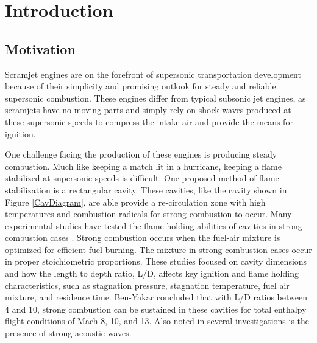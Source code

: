 
\chapter{Introduction} %

\label{Chapter2} %



\section{Motivation}

Scramjet engines are on the forefront of supersonic transportation development because of their simplicity and promising outlook for steady and reliable supersonic combustion. These engines differ from typical subsonic jet engines, as scramjets have no moving parts and simply rely on shock waves produced at these supersonic speeds to compress the intake air and provide the means for ignition.

One challenge facing the production of these engines is producing steady combustion. Much like keeping a match lit in a hurricane, keeping a flame stabilized at supersonic speeds is difficult. One proposed method of flame stabilization is a rectangular cavity. These cavities, like the cavity shown in Figure \ref{CavDiagram}, are able provide a re-circulation zone with high temperatures and combustion radicals for strong combustion to occur. Many experimental studies have tested the flame-holding abilities of cavities in strong combustion cases \cite{ben2000experimental,ben2001cavity,do2009plasma,yilmaz2013investigation}. Strong combustion occurs when the fuel-air mixture is optimized for efficient fuel burning. The mixture in strong combustion cases occur in proper stoichiometric proportions. These studies focused on cavity dimensions and how the length to depth ratio, L/D, affects key ignition and flame holding characteristics, such as stagnation pressure, stagnation temperature, fuel air mixture, and residence time. Ben-Yakar concluded that with L/D ratios between 4 and 10, strong combustion can be sustained in these cavities for total enthalpy flight conditions of Mach 8, 10, and 13\cite{ben2001cavity}. Also noted in several investigations is the presence of strong acoustic waves\cite{unalmis2004cavity,heller1996letter,williams2007supersonic, mcgregor1970drag,luo2011drag, sato1999advanced}. 

